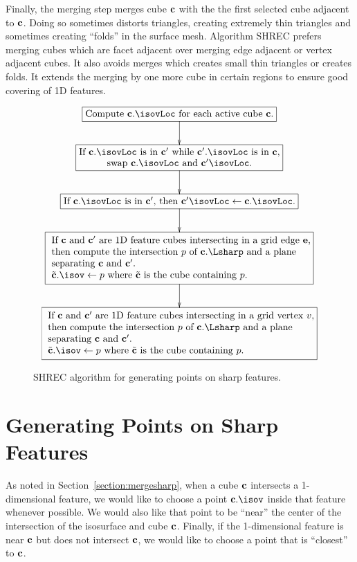 Finally, the merging step merges cube $\mathbf{c}$
with the the first selected cube adjacent to $\mathbf{c}$.
Doing so sometimes distorts triangles, creating extremely thin triangles
and sometimes creating ``folds'' in the surface mesh.
Algorithm SHREC prefers merging cubes which are facet
adjacent over merging edge adjacent or vertex adjacent cubes.
It also avoids merges which creates small thin triangles or creates folds.
It extends the merging by one more cube in certain regions
to ensure good covering of 1D features.


\begin{figure}
\begin{equation*}
\xymatrix{
\action{Compute $\cb.\isovLoc$ for each active cube $\cb$.} \ar[d] \\
\action{If $\cb.\isovLoc$ is in $\cb'$ while $\cb'.\isovLoc$ is in $\cb$,\\
swap $\cb.\isovLoc$ and $\cb'\isovLoc$.} \ar[d] \\
\action{If $\cb.\isovLoc$ is in $\cb'$,
then $\cb'\isovLoc \leftarrow \cb.\isovLoc$.} \ar[d] \\
\laction{If $\cb$ and $\cb'$ are 1D feature cubes intersecting 
in a grid edge $\eb$,\\
then compute the intersection $p$ of $\cb.\Lsharp$ and a plane\\
separating $\cb$ and $\cb'$.\\
$\tcb.\isov \leftarrow p$ where $\tcb$ is the cube containing $p$.} 
\ar[d] \\
\laction{If $\cb$ and $\cb'$ are 1D feature cubes intersecting 
in a grid vertex $v$,\\
then compute the intersection $p$ of $\cb.\Lsharp$ and a plane\\
separating $\cb$ and $\cb'$.\\
$\tcb.\isov \leftarrow p$ where $\tcb$ is the cube containing $p$.} 
}
\end{equation*}
\caption{SHREC algorithm for generating points on sharp features.}
\label{alg:shrec_isov}
\end{figure}

\section{Generating Points on Sharp Features}
\label{section:generation}

As noted in Section~\ref{section:mergesharp},
when a cube $\mathbf{c}$ intersects a 1-dimensional feature,
we would like to choose a point $\cb.\isov$ inside that feature 
whenever possible.
We would also like that point to be ``near'' the center
of the intersection of the isosurface and cube $\mathbf{c}$.
Finally, if the 1-dimensional feature is near $\mathbf{c}$ 
but does not intersect $\mathbf{c}$,
we would like to choose a point that is ``closest'' to $\mathbf{c}$.

